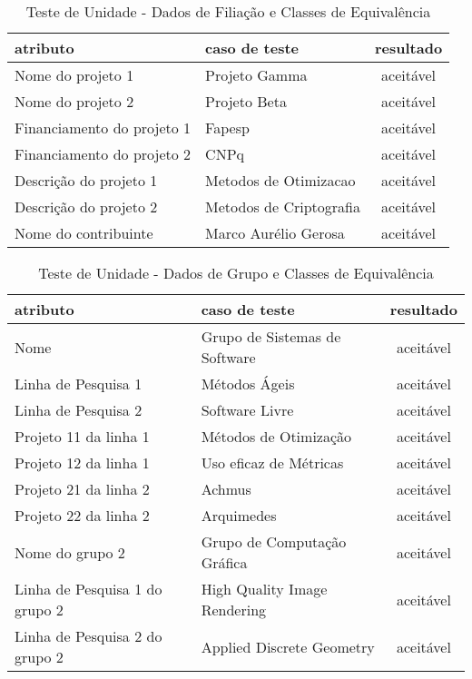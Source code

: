 \documentclass[11pt, a4paper]{book}
\begin{document}
\begin{table}
\renewcommand{\arraystretch}{1.3}
 \caption{Teste de Unidade - Dados de Filiação e Classes de Equivalência}
  \label{tab:table3}
\centering
\begin{tabular}[htb]{l|l|c}
\hline\hline
atributo & caso de teste & resultado\\
\hline
Nome do projeto 1& Projeto Gamma & aceitável \\
Nome do projeto 2& Projeto Beta & aceitável \\
Financiamento do projeto 1& Fapesp & aceitável \\
Financiamento do projeto 2 & CNPq & aceitável \\
Descrição do projeto 1 & Metodos de Otimizacao & aceitável \\
Descrição do projeto 2& Metodos de Criptografia & aceitável \\

Nome do contribuinte & Marco Aurélio Gerosa & aceitável \\
\hline 
\end{tabular}
\end{table}



\begin{table}
\renewcommand{\arraystretch}{1.3}
 \caption{Teste de Unidade - Dados de Grupo e Classes de Equivalência}
  \label{tab:table4}
\centering
\begin{tabular}[htb]{l|l|c}
\hline\hline
atributo & caso de teste & resultado\\
\hline
Nome& Grupo de Sistemas de Software & aceitável \\
Linha de Pesquisa 1& Métodos Ágeis & aceitável \\
Linha de Pesquisa 2& Software Livre & aceitável \\

Projeto 11 da linha 1& Métodos de Otimização & aceitável \\
Projeto 12 da linha 1 &  Uso eficaz de Métricas & aceitável \\
Projeto 21 da linha 2& Achmus & aceitável \\
Projeto 22 da linha 2  &  Arquimedes & aceitável \\

Nome do grupo 2 & Grupo de Computação Gráfica & aceitável \\
Linha de Pesquisa 1 do grupo 2& High Quality Image Rendering & aceitável \\
Linha de Pesquisa 2 do grupo 2& Applied Discrete Geometry & aceitável \\

\hline 
\end{tabular}
\end{table}
\end{document}
